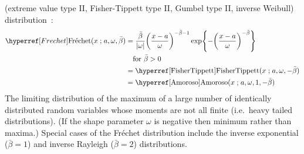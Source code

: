  (extreme value type II, Fisher-Tippett type II, Gumbel type II, inverse Weibull) distribution~\cite{Frechet1927,Gumbel1958}:
\begin{align}
\label{Frechet}
\Frechet(x \given a , \omega, \bar{\beta}) 
&=	\frac{\bar{\beta}}{| \omega |} \Left(\frac{x-a }{\omega}\Right)^{-\bar{\beta}-1} 
\exp\Left\{-\Left(\frac{x-a }{\omega}\Right)^{-\bar{\beta}}\Right\} \checked
\\ \notag &\quad \text{for } \bar{\beta}>0 \checked
\\  \notag
& = \opr{FisherTippett}(x\given  a, \omega, -\bar{\beta}) \checked
\\ \notag 
&= \opr{Amoroso}(x\given  a , \omega,1,-\bar{\beta})\notag \checked
\end{align}
The limiting distribution of the maximum of a large number of identically distributed random variables whose moments are not all finite (i.e.\ heavy tailed distributions).  (If the shape parameter $\omega$ is negative then minimum rather than maxima.)
Special cases of the Fr\'{e}chet  distribution include the inverse exponential ($\bar{\beta}=1$) and inverse Rayleigh ($\bar{\beta}=2$) distributions.
 






